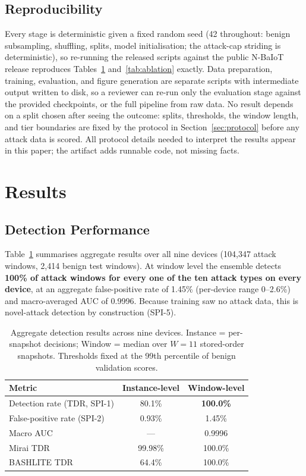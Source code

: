 \documentclass[sigconf,review,anonymous]{acmart}
\begin{document}
\subsection{Reproducibility}
Every stage is deterministic given a fixed random seed (42 throughout: benign subsampling, shuffling, splits, model initialisation; the attack-cap striding is deterministic), so re-running the released scripts against the public N-BaIoT release reproduces Tables~\ref{tab:overall} and~\ref{tab:ablation} exactly. Data preparation, training, evaluation, and figure generation are separate scripts with intermediate output written to disk, so a reviewer can re-run only the evaluation stage against the provided checkpoints, or the full pipeline from raw data. No result depends on a split chosen after seeing the outcome: splits, thresholds, the window length, and tier boundaries are fixed by the protocol in Section~\ref{sec:protocol} before any attack data is scored. All protocol details needed to interpret the results appear in this paper; the artifact adds runnable code, not missing facts.

\section{Results}
\label{sec:results}

\subsection{Detection Performance}
\label{sec:detection}

Table~\ref{tab:overall} summarises aggregate results over all nine devices (104{,}347 attack windows, 2{,}414 benign test windows). At window level the ensemble detects \textbf{100\% of attack windows for every one of the ten attack types on every device}, at an aggregate false-positive rate of 1.45\% (per-device range 0--2.6\%) and macro-averaged AUC of 0.9996. Because training saw no attack data, this is novel-attack detection by construction (SPI-5).

\begin{table}[t]
\caption{Aggregate detection results across nine devices. Instance = per-snapshot decisions; Window = median over $W{=}11$ stored-order snapshots. Thresholds fixed at the 99th percentile of benign validation scores.}
\label{tab:overall}
\small
\begin{tabular}{@{}lcc@{}}
\toprule
Metric & Instance-level & Window-level \\
\midrule
Detection rate (TDR, SPI-1) & 80.1\% & \textbf{100.0\%} \\
False-positive rate (SPI-2) & 0.93\% & 1.45\% \\
Macro AUC & --- & 0.9996 \\
Mirai TDR & 99.98\% & 100.0\% \\
BASHLITE TDR & 64.4\% & 100.0\% \\
\bottomrule
\end{tabular}
\end{table}
\end{document}
